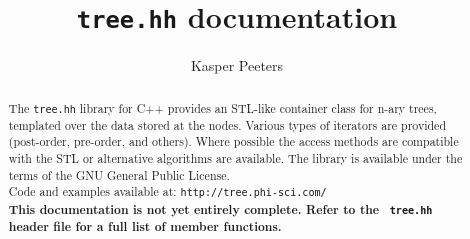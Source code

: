 \documentclass[11pt]{kasper}
\begin{document}
\title{{\tt tree.hh} documentation}
\author{Kasper Peeters}
\maketitle
\begin{abstract}
The {\tt tree.hh} library for C++ provides an STL-like container class
for n-ary trees, templated over the data stored at the nodes.  Various
types of iterators are provided (post-order, pre-order, and
others). Where possible the access methods are compatible with the STL
or alternative algorithms are available. The library is available
under the terms of the GNU General Public License.\\[3ex]
Code and examples available at: {\tt http://tree.phi-sci.com/}\\[3ex]
{\bf This documentation is not yet entirely complete. Refer to the {\tt
tree.hh} header file for a full list of member functions.}
\end{abstract}
\vfill
\maketoc
\eject
\end{document}
